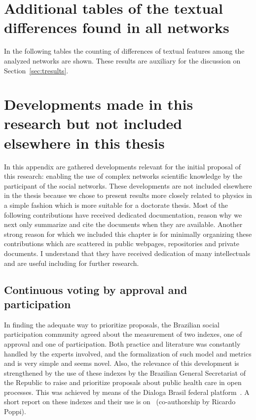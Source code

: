 
\begin{apendicesenv}
	\partapendices
	\chapter{Additional tables of the textual differences found in all networks}\label{ap:textd}
In the following tables the counting of differences of textual features among the analyzed networks
are shown.
	These results are auxiliary for the discussion on Section~\ref{sec:tresults}.
\FloatBarrier











\chapter{Developments made in this research but not included elsewhere in this thesis}\label{ap:vot}
In this appendix are gathered developments relevant for the initial proposal of this research:
enabling the use of complex networks scientific knowledge by the participant of the social networks.
These developments are not included elsewhere in the thesis because we chose to present results
more closely related to physics in a simple fashion which is more suitable for a doctorate thesis.
Most of the following contributions have received dedicated documentation,
reason why we next only summarize and cite the documents when they are available.
Another strong reason for which we included this chapter is for minimally organizing these contributions
which are scattered in public webpages, repositories and private documents.
I understand that they have received dedication of many intellectuals
and are useful including for further research.

\section{Continuous voting by approval and participation}
In finding the adequate way to prioritize proposals, the Brazilian social participation community agreed about the measurement of two indexes,
one of approval and one of participation. Both practice and literature
was constantly handled by the experts involved, and the formalization
of such model and metrics and is very simple and seems novel.
Also, the relevance of this development is strengthened by the use of these indexes by the
Brazilian General Secretariat of the Republic to raise and prioritize
proposals about public health care in open processes.
This was achieved by means of the Dialoga Brasil federal platform~\cite{dialoga}.
A short report on these indexes and their use is on~\cite{dialogaAlg}
	(co-authorship by Ricardo Poppi).


\end{apendicesenv}
